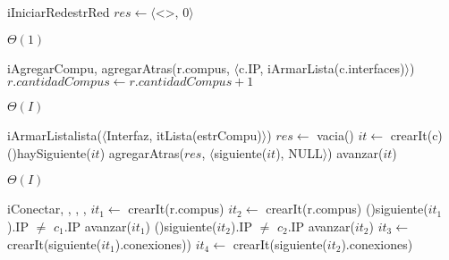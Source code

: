 \begin{Algoritmos}

  
  \begin{algoritmo}{iIniciarRed}{}{estrRed}
    $res \gets \langle$<>, 0$\rangle$ 
  \end{algoritmo}
  \datosAlgoritmo{} %
  {} %
  {} %
  {$\Theta(1)$} %
  {} %

  \begin{algoritmo}{iAgregarCompu}{, }{}
    agregarAtras(r.compus, $\langle$c.IP, iArmarLista(c.interfaces)$\rangle$)
    $r.cantidadCompus \gets r.cantidadCompus+1$ 
  \end{algoritmo}
  \datosAlgoritmo{} %
  {} %
  {} %
  {$\Theta(I)$} %
  {} %
  
  \begin{algoritmo}{iArmarLista}{}{lista($\langle$Interfaz, itLista(estrCompu)$\rangle$)}
    $res \gets$ vacia()
     $it \gets$ crearIt(c)
    \While(){haySiguiente($it$)}{
      agregarAtras($res$, $\langle$siguiente($it$), NULL$\rangle$)
      avanzar($it$)
    }
  \end{algoritmo}
  {} %
  {} %
  {$\Theta(I)$} %
  {} %
  
  \begin{algoritmo}{iConectar}{, , , , }{}
     $it_{1} \gets$ crearIt(r.compus)
     $it_{2} \gets$ crearIt(r.compus)
    \While(){siguiente($it_{1}$).IP $\neq$ $c_{1}$.IP}{
      avanzar($it_{1}$)
    }
    \While(){siguiente($it_{2}$).IP $\neq$ $c_{2}$.IP}{
      avanzar($it_{2}$)
    }
     $it_{3} \gets$ crearIt(siguiente($it_{1}$).conexiones))
     $it_{4} \gets$ crearIt(siguiente($it_{2}$).conexiones)
    

\end{algoritmo}
\end{Algoritmos}

